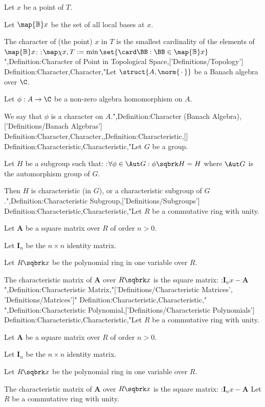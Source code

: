 Let $x$ be a point of $T$.

Let $\map {\mathbb B} x$ be the set of all local bases at $x$.


The character of (the point) $x$ in $T$ is the smallest cardinality of the elements of $\map {\mathbb B} x$:
:$\map \chi {x, T} := \min \set {\card \BB: \BB \in \map {\mathbb B} x}$",Definition:Character of Point in Topological Space,['Definitions/Topology']
Definition:Character,Character,"Let $\struct {A, \norm {\, \cdot \,} }$ be a Banach algebra over $\C$.

Let $\phi : A \to \C$ be a non-zero algebra homomorphism on $A$.


We say that $\phi$ is a character on $A$.",Definition:Character (Banach Algebra),['Definitions/Banach Algebras']
Definition:Character,Character,,Definition:Characteristic,[]
Definition:Characteristic,Characteristic,"Let $G$ be a group.

Let $H$ be a subgroup such that:
:$\forall \phi \in \Aut G: \phi \sqbrk H = H$
where $\Aut G$ is the automorphism group of $G$.


Then $H$ is  characteristic (in $G$), or a characteristic subgroup of $G$.",Definition:Characteristic Subgroup,['Definitions/Subgroups']
Definition:Characteristic,Characteristic,"Let $R$ be a commutative ring with unity.

Let $\mathbf A$ be a square matrix over $R$ of order $n > 0$.

Let $\mathbf I_n$ be the $n \times n$ identity matrix.

Let $R \sqbrk x$ be the polynomial ring in one variable over $R$.


The characteristic matrix of $\mathbf A$ over $R \sqbrk x$ is the square matrix:
:$\mathbf I_n x - \mathbf A$",Definition:Characteristic Matrix,"['Definitions/Characteristic Matrices', 'Definitions/Matrices']"
Definition:Characteristic,Characteristic,"
",Definition:Characteristic Polynomial,['Definitions/Characteristic Polynomials']
Definition:Characteristic,Characteristic,"Let $R$ be a commutative ring with unity.

Let $\mathbf A$ be a square matrix over $R$ of order $n > 0$.

Let $\mathbf I_n$ be the $n \times n$ identity matrix.

Let $R \sqbrk x$ be the polynomial ring in one variable over $R$.


The characteristic matrix of $\mathbf A$ over $R \sqbrk x$ is the square matrix:
:$\mathbf I_n x - \mathbf A$
Let $R$ be a commutative ring with unity.

